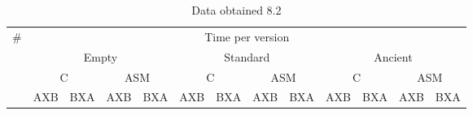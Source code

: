 \documentclass[legalpaper,12pt]{article}
\begin{document}
\begin{table}[h]
\centering
\caption*{Data obtained 8.2}
\begin{tabular}{|l|l|l|l|l|l|l|l|l|l|l|l|l|}
\hline
\multicolumn{1}{|c|}{\multirow{4}{*}{\#}} & \multicolumn{12}{c|}{Time per version}                                                                                                                 \\ \cline{2-13} 
\multicolumn{1}{|c|}{}                    & \multicolumn{4}{c|}{Empty}                       & \multicolumn{4}{c|}{Standard}                    & \multicolumn{4}{c|}{Ancient}                        \\ \cline{2-13} 
\multicolumn{1}{|c|}{}                    & \multicolumn{2}{c|}{C} & \multicolumn{2}{c|}{ASM} & \multicolumn{2}{c|}{C} & \multicolumn{2}{c|}{ASM} & \multicolumn{2}{c|}{C} & \multicolumn{2}{c|}{ASM} \\ \cline{2-13} 
\multicolumn{1}{|c|}{}                    & AXB        & BXA       & AXB         & BXA        & AXB        & BXA       & AXB         & BXA        & AXB        & BXA       & AXB         & BXA        



\end{tabular}
\end{table}
\end{document}
